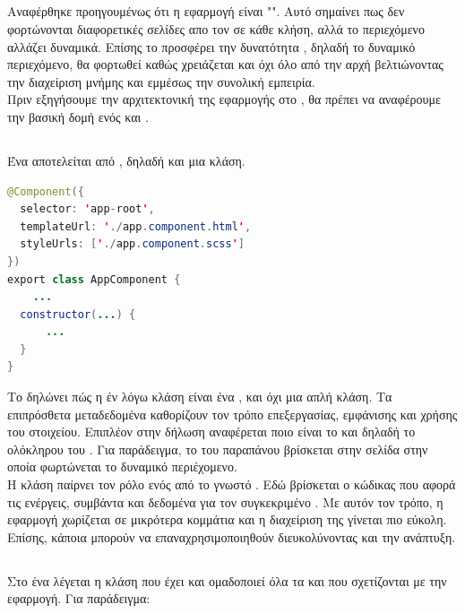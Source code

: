 \subsection{}
\pSpace Αναφέρθηκε προηγουμένως ότι η εφαρμογή είναι "". Αυτό σημαίνει πως δεν φορτώνονται διαφορετικές σελίδες απο τον  σε κάθε κλήση, αλλά το περιεχόμενο αλλάζει δυναμικά. Επίσης το  προσφέρει την δυνατότητα , δηλαδή το δυναμικό περιεχόμενο, θα φορτωθεί καθώς χρειάζεται και όχι όλο από την αρχή βελτιώνοντας την διαχείριση μνήμης και εμμέσως την συνολική εμπειρία.\\
\pSpace Πριν εξηγήσουμε την αρχιτεκτονική της εφαρμογής στο , θα πρέπει να αναφέρουμε την βασική δομή ενός  και .\\
\subsection*{}
\pSpace Ένα  αποτελείται από , δηλαδή  και μια κλάση.
	\begin{lstlisting}[language=Java]
@Component({
  selector: 'app-root',
  templateUrl: './app.component.html',
  styleUrls: ['./app.component.scss']
})
export class AppComponent {
	...
  constructor(...) {
      ...
  }
}
	\end{lstlisting}
\pSpace Το  δηλώνει πώς η έν λόγω κλάση είναι ένα , και όχι μια απλή κλάση. Τα επιπρόσθετα μεταδεδομένα καθορίζουν τον τρόπο επεξεργασίας, εμφάνισης και χρήσης του στοιχείου. Επιπλέον στην δήλωση αναφέρεται ποιο είναι το  και  δηλαδή το  ολόκληρου του . Για παράδειγμα, το  του παραπάνου βρίσκεται στην σελίδα στην οποία φωρτώνεται το δυναμικό περιέχομενο.\\
\pSpace Η κλάση παίρνει τον ρόλο ενός  από το γνωστό . Εδώ βρίσκεται ο κώδικας που αφορά τις ενέργεις, συμβάντα και δεδομένα για τον συγκεκριμένο . Με αυτόν τον τρόπο, η εφαρμογή χωρίζεται σε μικρότερα κομμάτια και η διαχείριση της γίνεται πιο εύκολη. Επίσης, κάποια  μπορούν να επαναχρησιμοποιηθούν διευκολύνοντας και την ανάπτυξη.

\subsection*{}
\pSpace Στο  ένα  λέγεται η κλάση που έχει  και ομαδοποιεί όλα τα  και  που σχετίζονται με την εφαρμογή. Για παράδειγμα:\\

